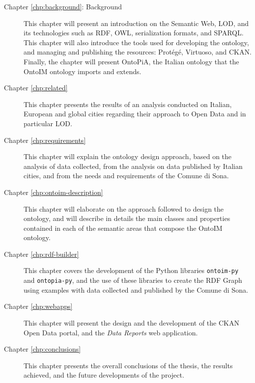 \begin{description}
  \item[Chapter \ref{chp:background}: Background] This chapter will present an introduction on the Semantic Web, \acl{LOD}, and its technologies such as \acs{RDF}, \acs{OWL}, serialization formats, and \acs{SPARQL}. This chapter will also introduce the tools used for developing the ontology, and managing and publishing the resources: Protégé, Virtuoso, and CKAN. Finally, the chapter will present OntoPiA, the Italian ontology that the OntoIM ontology imports and extends.
  \item[Chapter \ref{chp:related}] This chapter presents the results of an analysis conducted on Italian, European and global cities regarding their approach to Open Data and in particular \acl{LOD}.
  \item[Chapter \ref{chp:requirements}] This chapter will explain the ontology design approach, based on the analysis of data collected, from the analysis on data published by Italian cities, and from the needs and requirements of the Comune di Sona.
  \item[Chapter \ref{chp:ontoim-description}] This chapter will elaborate on the approach followed to design the ontology, and will describe in details the main classes and properties contained in each of the semantic areas that compose the \ac{OntoIM} ontology.
  \item[Chapter \ref{chp:rdf-builder}] This chapter covers the development of the Python libraries \verb#ontoim-py# and \verb#ontopia-py#, and the use of these libraries to create the \acs{RDF} Graph using examples with data collected and published by the Comune di Sona.
  \item[Chapter \ref{chp:webapps}] This chapter will present the design and the development of the CKAN Open Data portal, and the \textit{Data Reports} web application.
  \item[Chapter \ref{chp:conclusions}] This chapter presents the overall conclusions of the thesis, the results achieved, and the future developments of the project.
\end{description}